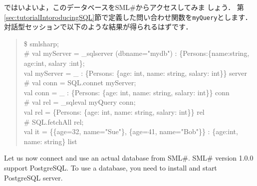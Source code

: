\documentclass{jbook}
\newcommand{\smlsharp}{SML\#}
\newcommand{\version}{1.0.0}
\newenvironment{program}{\begin{tt}\begin{quote}}{\end{quote}\end{tt}}
\begin{document}
	ではいよいよ，このデータベースを\smlsharp{}からアクセスしてみま
しょう．
	第\ref{sec:tutorialIntoroducingSQL}節で定義した問い合わせ関数を{\tt myQuery}とします．
	対話型セッションで以下のような結果が得られるはずです．
\begin{program}
\$ smlsharp;\\
\# val myServer = \_sqlserver (dbname="mydb") : \{Persons:\{name:string, age:int, salary :int\};\\
val myServer = \_ : \{Persons: \{age: int, name: string, salary: int\}\} server\\
\# val conn = SQL.connet myServer;\\
val conn = \_ : \{Persons: \{age: int, name: string, salary: int\}\} conn\\
\# val rel = \_sqleval myQuery conn;\\
val rel = \{Persons: \{age: int, name: string, salary: int\}\} rel\\
\# SQL.fetchAll rel;\\
val it = \{\{age=32, name="Sue"\}, \{age=41, name="Bob"\}\} : \{age:int, name: string\} list
\end{program}
\else%
	Let us now connect and use an actual database from \smlsharp{}.
	\smlsharp{} version \version{} support PostgreSQL.
	To use a database, you need to install and start PostgreSQL server.
	
\end{document}
